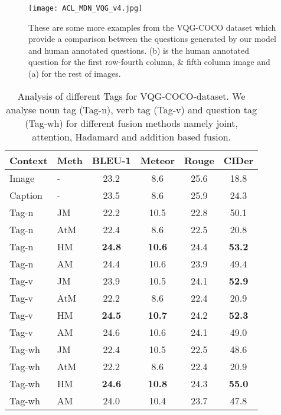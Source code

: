 \documentclass[11pt,a4paper]{article}
\begin{document}
\begin{figure*}[ht]
	\texttt{[image: ACL\_MDN\_VQG\_v4.jpg]}
	\caption{These are some more examples from the VQG-COCO dataset which provide a comparison between the questions generated by our model and human annotated questions. (b) is the human annotated question for the first row-fourth column, \& fifth column image and (a) for the rest of images.}
	\label{fig:natural}
\end{figure*}






\begin{table}[ht]
\scriptsize
\centering
\begin{tabular}{|l|l|cccc|}
\hline \bf Context & \bf Meth & \bf BLEU-1 & \bf Meteor & \bf Rouge & \bf CIDer \\ \hline 
Image & - & 23.2  &  8.6  & 25.6 & 18.8\\
Caption  &- & 23.5 & 8.6  & 25.9 & 24.3\\\hline
Tag-n & JM &22.2 &10.5 & 22.8 &50.1 \\
Tag-n & AtM & 22.4 &8.6 & 22.5 & 20.8\\
Tag-n & HM &\bf24.8&\bf10.6& 24.4 & \bf53.2\\
Tag-n & AM &24.4 &10.6& 23.9 & 49.4\\ \hline


Tag-v & JM & 23.9 &10.5  &24.1 &\bf52.9 \\
Tag-v & AtM & 22.2 &8.6 &22.4 &20.9\\
Tag-v & HM &\bf24.5 &\bf10.7&24.2 &\bf52.3 \\
Tag-v & AM & 24.6 &10.6 &24.1 &49.0\\ \hline


Tag-wh & JM &22.4  &10.5 &22.5 &48.6\\
Tag-wh & AtM &22.2  &8.6 &22.4 &20.9\\
Tag-wh & HM & \bf24.6 &\bf10.8& 24.3 & \textbf{55.0}\\
Tag-wh & AM &24.0  &10.4 &23.7 &47.8\\ \hline

\end{tabular}
\caption{\label{score_tab_7}  Analysis of different Tags for VQG-COCO-dataset. We analyse noun tag (Tag-n), verb tag (Tag-v) and question tag (Tag-wh) for different fusion methods namely joint, attention, Hadamard and addition based fusion.}
\end{table}
\end{document}
